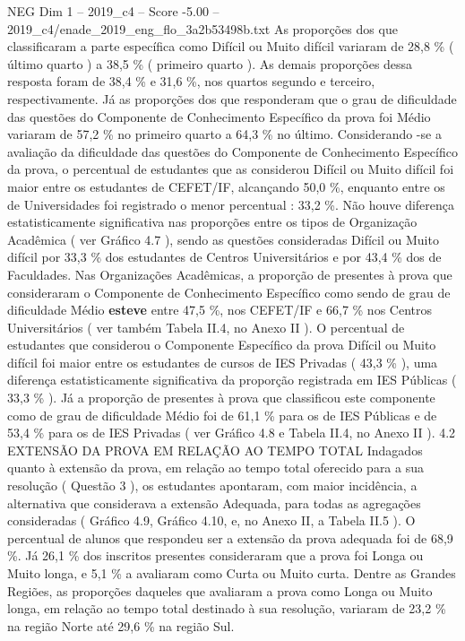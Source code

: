 \begin{textsample}{NEG Dim 1 – 2019\_c4 – Score -5.00 – 2019\_c4/enade\_2019\_eng\_flo\_3a2b53498b.txt}
As proporções dos que classificaram a parte específica como Difícil ou Muito difícil variaram de 28,8 \% ( último quarto ) a 38,5 \% ( primeiro quarto ).
As demais proporções dessa resposta foram de 38,4 \% e 31,6 \%, nos quartos segundo e terceiro, respectivamente.
Já as proporções dos que responderam que o grau de dificuldade das questões do Componente de Conhecimento Específico da prova foi Médio variaram de 57,2 \% no primeiro quarto a 64,3 \% no último.
Considerando -se a avaliação da dificuldade das questões do Componente de Conhecimento Específico da prova, o percentual de estudantes que as considerou Difícil ou Muito difícil foi maior entre os estudantes de CEFET/IF, alcançando 50,0 \%, enquanto entre os de Universidades foi registrado o menor percentual : 33,2 \%.
Não houve diferença estatisticamente significativa nas proporções entre os tipos de Organização Acadêmica ( ver Gráfico 4.7 ), sendo as questões consideradas Difícil ou Muito difícil por 33,3 \% dos estudantes de Centros Universitários e por 43,4 \% dos de Faculdades.
Nas Organizações Acadêmicas, a proporção de presentes à prova que consideraram o Componente de Conhecimento Específico como sendo de grau de dificuldade Médio \textbf{esteve} entre 47,5 \%, nos CEFET/IF e 66,7 \% nos Centros Universitários ( ver também Tabela II.4, no Anexo II ).
O percentual de estudantes que considerou o Componente Específico da prova Difícil ou Muito difícil foi maior entre os estudantes de cursos de IES Privadas ( 43,3 \% ), uma diferença estatisticamente significativa da proporção registrada em IES Públicas ( 33,3 \% ).
Já a proporção de presentes à prova que classificou este componente como de grau de dificuldade Médio foi de 61,1 \% para os de IES Públicas e de 53,4 \% para os de IES Privadas ( ver Gráfico 4.8 e Tabela II.4, no Anexo II ). 4.2 EXTENSÃO DA PROVA EM RELAÇÃO AO TEMPO TOTAL Indagados quanto à extensão da prova, em relação ao tempo total oferecido para a sua resolução ( Questão 3 ), os estudantes apontaram, com maior incidência, a alternativa que considerava a extensão Adequada, para todas as agregações consideradas ( Gráfico 4.9, Gráfico 4.10, e, no Anexo II, a Tabela II.5 ).
O percentual de alunos que respondeu ser a extensão da prova adequada foi de 68,9 \%.
Já 26,1 \% dos inscritos presentes consideraram que a prova foi Longa ou Muito longa, e 5,1 \% a avaliaram como Curta ou Muito curta.
Dentre as Grandes Regiões, as proporções daqueles que avaliaram a prova como Longa ou Muito longa, em relação ao tempo total destinado à sua resolução, variaram de 23,2 \% na região Norte até 29,6 \% na região Sul.

\end{textsample}
